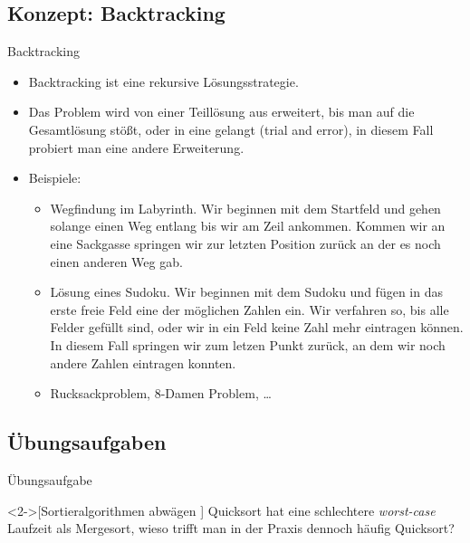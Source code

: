 \subsection{Konzept: Backtracking}

\begin{frame}{Backtracking}
    \begin{itemize}[<+(1)->]
        \item Backtracking ist eine rekursive Lösungsstrategie.
        \item Das Problem wird von einer Teillösung aus erweitert, bis man auf die Gesamtlösung stößt,\pause{} oder in eine  gelangt (trial and error), in diesem Fall probiert man eine andere Erweiterung.
        \item Beispiele: \begin{itemize}
            \item Wegfindung im Labyrinth.\pause{} Wir beginnen mit dem Startfeld und gehen solange einen Weg entlang bis wir am Zeil ankommen.\pause{} Kommen wir an eine Sackgasse springen wir zur letzten Position zurück an der es noch einen anderen Weg gab.
            \item Lösung eines Sudoku.\pause{} Wir beginnen mit dem Sudoku und fügen in das erste freie Feld eine der möglichen Zahlen ein.\pause{} Wir verfahren so, bis alle Felder gefüllt sind, oder wir in ein Feld keine Zahl mehr eintragen können.\pause{} In diesem Fall springen wir zum letzen Punkt zurück, an dem wir noch andere Zahlen eintragen konnten.
            \item Rucksackproblem, \(8\)-Damen Problem, \ldots
        \end{itemize}
    \end{itemize}
\end{frame}

\subsection{Übungsaufgaben}

\begin{frame}[c]{Übungsaufgabe}
    \begin{exercise}<2->[Sortieralgorithmen abwägen ]
        Quicksort hat eine schlechtere \emph{worst-case} Laufzeit als Mergesort, wieso trifft man in der Praxis dennoch häufig Quicksort?
    \end{exercise}
\end{frame}

